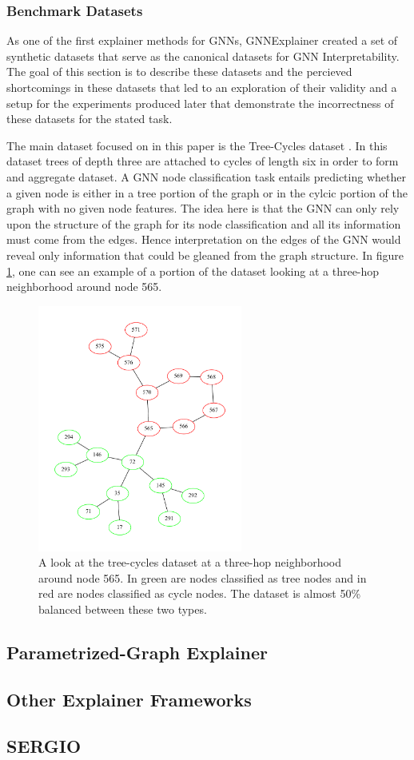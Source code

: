 \subsubsection{Benchmark Datasets}
As one of the first explainer methods for GNNs, GNNExplainer created a set of synthetic datasets that serve as the canonical datasets for GNN Interpretability. The goal of this section is to describe these datasets and the percieved shortcomings in these datasets that led to an exploration of their validity and a setup for the experiments produced later that demonstrate the incorrectness of these datasets for the stated task.

The main dataset focused on in this paper is the Tree-Cycles dataset \cite{ying_gnnexplainer_2019}. In this dataset trees of depth three are attached to cycles of length six in order to form and aggregate dataset. A GNN node classification task entails predicting whether a given node is either in a tree portion of the graph or in the cylcic portion of the graph with no given node features. The idea here is that the GNN can only rely upon the structure of the graph for its node classification and all its information must come from the edges. Hence interpretation on the edges of the GNN would reveal only information that could be gleaned from the graph structure. In figure \ref{fig:tree-cycles}, one can see an example of a portion of the dataset looking at a three-hop neighborhood around node 565.
\begin{figure}[t]
	\centering
	\includegraphics[width=0.6\textwidth]{images/tree-cycles.pdf}
	\caption{A look at the tree-cycles dataset at a three-hop neighborhood around node 565. In green are nodes classified as tree nodes and in red are nodes classified as cycle nodes. The dataset is almost 50\% balanced between these two types.}
	\label{fig:tree-cycles}
\end{figure}

\subsection{Parametrized-Graph Explainer}

\subsection{Other Explainer Frameworks}

\subsection{SERGIO}

